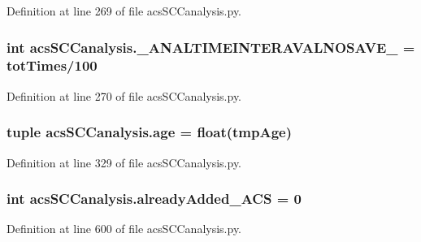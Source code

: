 Definition at line 269 of file acs\-S\-C\-Canalysis.\-py.

\hypertarget{a00096_a7665e828ed7f27f4ba353e9645ad716d}{
\subsubsection[{\-\_\-\-A\-N\-A\-L\-T\-I\-M\-E\-I\-N\-T\-E\-R\-A\-V\-A\-L\-N\-O\-S\-A\-V\-E\-\_\-}]{\setlength{\rightskip}{0pt plus 5cm}int acs\-S\-C\-Canalysis.\-\_\-\-A\-N\-A\-L\-T\-I\-M\-E\-I\-N\-T\-E\-R\-A\-V\-A\-L\-N\-O\-S\-A\-V\-E\-\_\- = {\bf tot\-Times}/100}}\label{a00096_a7665e828ed7f27f4ba353e9645ad716d}


Definition at line 270 of file acs\-S\-C\-Canalysis.\-py.

\hypertarget{a00096_a98baad82b74a27e8b8c58aa985b7d374}{
\subsubsection[{age}]{\setlength{\rightskip}{0pt plus 5cm}tuple acs\-S\-C\-Canalysis.\-age = float(tmp\-Age)}}\label{a00096_a98baad82b74a27e8b8c58aa985b7d374}


Definition at line 329 of file acs\-S\-C\-Canalysis.\-py.

\hypertarget{a00096_a38f20e6b1cad6a61f1c9b87b37c76f63}{
\subsubsection[{already\-Added\-\_\-\-A\-C\-S}]{\setlength{\rightskip}{0pt plus 5cm}int acs\-S\-C\-Canalysis.\-already\-Added\-\_\-\-A\-C\-S = 0}}\label{a00096_a38f20e6b1cad6a61f1c9b87b37c76f63}


Definition at line 600 of file acs\-S\-C\-Canalysis.\-py.

